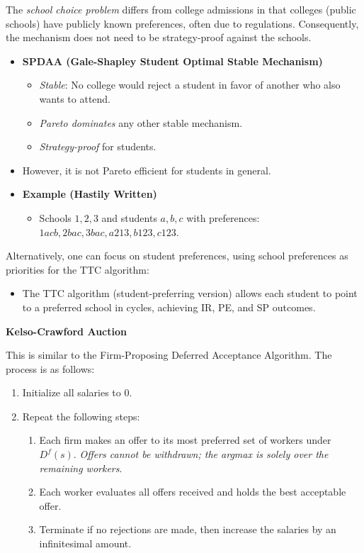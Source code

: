 \documentclass[8pt]{scrartcl}
\begin{document}
\begin{multicols*}{2}
The \textit{school choice problem} differs from college admissions in that colleges (public schools) have publicly known preferences, often due to regulations. Consequently, the mechanism does not need to be strategy-proof against the schools.
\begin{itemize}
    \item \textbf{SPDAA (Gale-Shapley Student Optimal Stable Mechanism)}
    \begin{itemize}
        \item \textit{Stable}: No college would reject a student in favor of another who also wants to attend.
        \item \textit{Pareto dominates} any other stable mechanism.
        \item \textit{Strategy-proof} for students.
    \end{itemize}
    \item However, it is not Pareto efficient for students in general.
\end{itemize}

\begin{itemize}
    \item \textbf{Example (Hastily Written)}
    \begin{itemize}
        \item Schools $1, 2, 3$ and students $a, b, c$ with preferences: $1acb, 2bac, 3bac, a213, b123, c123$.
    \end{itemize}
\end{itemize}

Alternatively, one can focus on student preferences, using school preferences as priorities for the TTC algorithm:
\begin{itemize}
    \item The TTC algorithm (student-preferring version) allows each student to point to a preferred school in cycles, achieving IR, PE, and SP outcomes.
\end{itemize}

    \textbf{Kelso-Crawford Auction}

This is similar to the Firm-Proposing Deferred Acceptance Algorithm. The process is as follows:

\begin{enumerate}
    \item Initialize all salaries to $0$.
    \item Repeat the following steps:
    \begin{enumerate}
        \item Each firm makes an offer to its most preferred set of workers under $D^f(s)$. \textit{Offers cannot be withdrawn; the argmax is solely over the remaining workers}.
        \item Each worker evaluates all offers received and holds the best acceptable offer.
        \item Terminate if no rejections are made, then increase the salaries by an infinitesimal amount.
    \end{enumerate}
\end{enumerate}


\end{multicols*}
\end{document}
